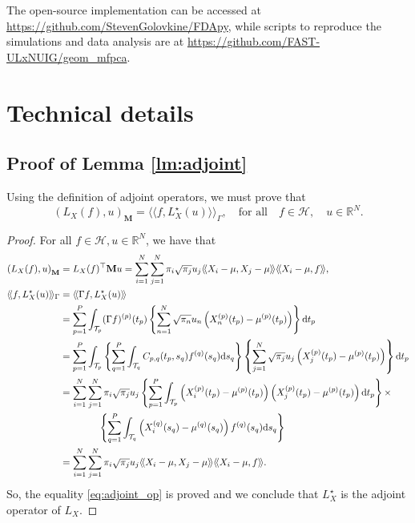 \documentclass[times,sort&compress,3p]{elsarticle}
\theoremstyle{plain}%
\theoremstyle{definition}
\newcommand{\RR}{\mathbb{R}} %
\newcommand{\dd}{{\rm d}}
\newcommand{\TT}[1]{\mathcal{T}_{#1}} %
\newcommand{\HH}{\mathcal{H}} %
\newcommand{\inRM}[2]{\left(#1, #2\right)_{\mathbf{M}}}
\newcommand{\inH}[2]{\langle\!\langle#1, #2\rangle\!\rangle}
\newcommand{\inHG}[2]{\langle\!\langle#1, #2\rangle\!\rangle_\Gamma}
\newcommand{\Xnp}{X_n^{(p)}} %
\newcommand{\mup}[1]{\mu^{(#1)}} %
\begin{document}
The open-source implementation can be accessed at \url{https://github.com/StevenGolovkine/FDApy}, while scripts to reproduce the simulations and data analysis are at \url{https://github.com/FAST-ULxNUIG/geom_mfpca}.


\section{Technical details}

\subsection{Proof of Lemma \ref{lm:adjoint}} %
\label{sub:proof_of_lemma_lm:adjoint}

Using the definition of adjoint operators, we must prove that
\begin{equation}\label{eq:adjoint_op}
    \inRM{L_X(f)}{u} = \inHG{f}{L^\star_X(u)}, \quad\text{for all}\quad f \in \HH,\quad u \in \RR^N.
\end{equation}

\begin{proof}
For all $f \in \HH, u \in \RR^N$, we have that
\begin{align*}
    \inRM{L_X(f)}{u} &= L_X(f)^\top \mathbf{M} u = \sum_{i = 1}^N\sum_{j = 1}^N \pi_i \sqrt{\pi_j} u_j \inH{X_i - \mu}{X_j - \mu}\inH{X_i - \mu}{f}, \\
    \inHG{f}{L^\star_X(u)} &= \inH{\Gamma f}{L^\star_X(u)} \\
    &= \sum_{p = 1}^P \int_{\TT{p}} (\Gamma f)^{(p)}(t_p) \left\{ \sum_{n = 1}^N \sqrt{\pi_n} u_n \left(\Xnp(t_p) - \mup{p}(t_p)\right) \right\} \dd t_p \\
    &= \sum_{p = 1}^P \int_{\TT{p}} \left\{\sum_{q = 1}^P \int_{\TT{q}} C_{p,q}(t_p, s_q)f^{(q)}(s_q) \dd s_q\right\} \left\{ \sum_{j = 1}^N \sqrt{\pi_j} u_j \left(X_j^{(p)}(t_p) - \mup{p}(t_p)\right) \right\} \dd t_p \\
    &= \sum_{i = 1}^N \sum_{j = 1}^N \pi_i \sqrt{\pi_j} u_j \left\{\sum_{p = 1}^P \int_{\TT{p}} \left(X_i^{(p)}(t_p) - \mup{p}(t_p)\right)\left(X_j^{(p)}(t_p) - \mup{p}(t_p)\right)\dd t_p\right\} \times \\
    &\qquad\qquad \left\{\sum_{q = 1}^P \int_{\TT{q}} \left(X_i^{(q)}(s_q) - \mup{q}(s_q)\right)f^{(q)}(s_q)\dd s_q\right\} \\
    &= \sum_{i = 1}^N\sum_{j = 1}^N \pi_i \sqrt{\pi_j} u_j \inH{X_i - \mu}{X_j - \mu}\inH{X_i - \mu}{f}.
\end{align*}
So, the equality \eqref{eq:adjoint_op} is proved and we conclude that $L^\star_X$ is the adjoint operator of $L_X$.    
\end{proof}
\end{document}
